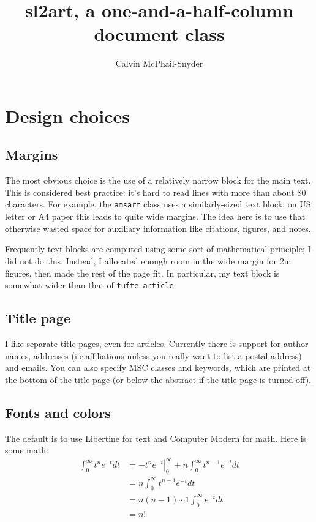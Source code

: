 \documentclass{sl2art}
\title{sl2art, a one-and-a-half-column document class}
\author{Calvin McPhail-Snyder}
\begin{document}
\maketitle
\tableofcontents

\section{Design choices}

\subsection{Margins}
The most obvious choice is the use of a relatively narrow block for the main text.
This is considered best practice: it's hard to read lines with more than about 80 characters.
For example, the \texttt{amsart} class uses a similarly-sized text block; on US letter or A4 paper this leads to quite wide margins.
The idea here is to use that otherwise wasted space for auxiliary information like citations, figures, and notes.

Frequently text blocks are computed using some sort of mathematical principle; I did not do this.
Instead, I allocated enough room in the wide margin for 2in figures, then made the rest of the page fit.
In particular, my text block is somewhat wider than that of \texttt{tufte-article}.

\subsection{Title page}
I like separate title pages, even for articles.
Currently there is support for author names, addresses (i.e.\@ affiliations unless you really want to list a postal address) and emails.
You can also specify MSC classes and keywords, which are printed at the bottom of the title page (or below the abstract if the title page is turned off).

\subsection{Fonts and colors}
The default is to use Libertine for text and Computer Modern for math.
Here is some math:
\begin{align*}
  \int_{0}^{\infty} t^{n} e^{-t} dt
  &=
  \left.- t^{n} e^{-t} \right|_{0}^{\infty}
  +
  n \int_{0}^{\infty} t^{n-1} e^{-t} dt
  \\
  &=
  n \int_{0}^{\infty} t^{n-1} e^{-t} dt
  \\
  &= n(n-1) \cdots 1 \int_{0}^{\infty} e^{-t} dt
  \\
  &= n!
\end{align*}
\end{document}
